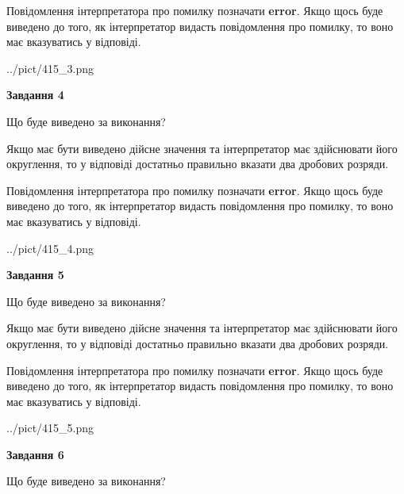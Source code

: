 \documentclass[12pt, ukrainian]{article}
\begin{document}
{\begin {Large}
Повідомлення інтерпретатора про помилку позначати \textbf{error}.
Якщо щось буде виведено до того, як інтерпретатор видасть повідомлення про помилку, 
то воно має вказуватись у відповіді. \par

\begin{center}
	{../pict/415_3.png}
\end{center}
\newpage

{\begin {center}\textbf{Завдання 4}\end {center}}\par
Що буде виведено за виконання? \par

Якщо має бути виведено дійсне значення та інтерпретатор має здійснювати його округлення, 
то у відповіді достатньо правильно вказати два дробових розряди.

Повідомлення інтерпретатора про помилку позначати \textbf{error}.
Якщо щось буде виведено до того, як інтерпретатор видасть повідомлення про помилку, 
то воно має вказуватись у відповіді. \par

\begin{center}
	{../pict/415_4.png}
\end{center}
\newpage

{\begin {center}\textbf{Завдання 5}\end {center}}\par
Що буде виведено за виконання? \par

Якщо має бути виведено дійсне значення та інтерпретатор має здійснювати його округлення, 
то у відповіді достатньо правильно вказати два дробових розряди.

Повідомлення інтерпретатора про помилку позначати \textbf{error}.
Якщо щось буде виведено до того, як інтерпретатор видасть повідомлення про помилку, 
то воно має вказуватись у відповіді. \par

\begin{center}
	{../pict/415_5.png}
\end{center}
\newpage

{\begin {center}\textbf{Завдання 6}\end {center}}\par
Що буде виведено за виконання? \par


\end{Large}}
\end{document}
